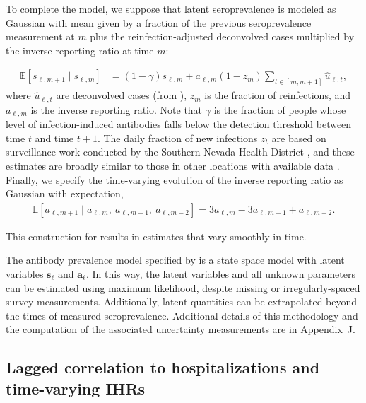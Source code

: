 \begin{linenomath*}
To complete the model, we suppose that latent seroprevalence is modeled as 
Gaussian with mean given by a fraction of the previous seroprevalence
measurement at $m$ plus the reinfection-adjusted deconvolved cases multiplied by
the inverse reporting ratio at time $m$:
\end{linenomath*}
\begin{linenomath*}
\begin{align}
  \label{eq:expect-sero}
\mathbb{E}[s_{\ell,m+1} \mid s_{\ell,m}] & = (1 -\gamma) s_{\ell,m} 
+ a_{\ell,m} (1 - z_{m}) \sum_{t\in[m,m+1]}\widehat{u}_{\ell,t},
\end{align}
where $\widehat{u}_{\ell,t}$ are deconvolved cases (from
), $z_{m}$ is the fraction of reinfections, and
$a_{\ell,m}$ is the inverse reporting ratio. Note that $\gamma$ is the fraction
of people whose level of infection-induced antibodies falls below the detection
threshold between time $t$ and time $t+1$. The daily fraction of new infections
$z_t$ are based on surveillance work conducted by the Southern Nevada Health
District \citep{ruff2022rapid}, and these estimates are broadly similar to those
in other locations with available data \citep{ruff2022rapid, nyreinfect2021,
hireinfect2022, wareinfect2022}. Finally, we specify the time-varying evolution
of the inverse reporting ratio as Gaussian with expectation,
\begin{align}
  \label{eq:report-ratio}
\mathbb{E}[a_{\ell,m+1} \mid a_{\ell,m},\ a_{\ell,m-1},\ a_{\ell,m-2}] = 3a_{\ell,m} - 3a_{\ell,m-1} + a_{\ell,m-2}.
\end{align}
\end{linenomath*}
This construction for  results in estimates that vary
smoothly in time.

    
The antibody prevalence model specified by
 is a state space model with
latent variables $\mathbf{s}_{\ell}$ and $\mathbf{a}_{\ell}$. In this way, 
the latent variables and all unknown parameters can be estimated using maximum likelihood, despite
missing or irregularly-spaced survey
measurements. Additionally, latent quantities can be extrapolated beyond the
times of measured seroprevalence. Additional details of
this methodology and the computation of the associated uncertainty measurements
are in Appendix~J.



\subsection{Lagged correlation to hospitalizations and time-varying IHRs} 
\label{sec:ihr-calculations}


